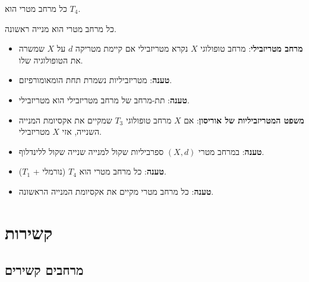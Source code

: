 \documentclass{tstextbook}
\begin{document}
\begin{proposition}
כל מרחב מטרי הוא \(T_{4}\).

\end{proposition}
\begin{proposition}
כל מרחב מטרי הוא מנייה ראשונה.

\end{proposition}
\begin{summary}
  \begin{itemize}
    \item \textbf{מרחב מטריזבילי}: מרחב טופולוגי \(X\) נקרא מטריזבילי אם קיימת מטריקה \(d\) על \(X\) שמשרה את הטופולוגיה שלו.
    \item \textbf{טענה}: מטריזביליות נשמרת תחת הומאומורפיזם.
    \item \textbf{טענה}: תת-מרחב של מרחב מטריזבילי הוא מטריזבילי.
    \item \textbf{משפט המטריזביליות של אוריסון}: אם \(X\) מרחב טופולוגי \(T_{3}\) שמקיים את אקסיומת המנייה השנייה, אזי \(X\) מטריזבילי.
    \item \textbf{טענה}: במרחב מטרי \((X,d)\) ספרביליות שקול למנייה שנייה שקול ללינדלוף.
    \item \textbf{טענה}: כל מרחב מטרי הוא \(T_{4}\) (נורמלי + \(T_{1}\)).
    \item \textbf{טענה}: כל מרחב מטרי מקיים את אקסיומת המנייה הראשונה.
  \end{itemize}
\end{summary}
\chapter{קשירות}

\section{מרחבים קשירים}
\end{document}

